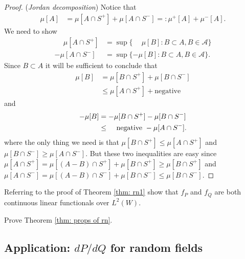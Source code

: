 \begin{shaded}
\begin{proof}
({\it Jordan decomposition}) Notice that
\begin{align*}
\mu[A]
& = \mu[A\cap S^+] + \mu[A\cap S^-] =:\mu^+[A] + \mu^-[A].
\end{align*}
We need to show
\begin{align*}
\phantom{-}\mu[A\cap S^+] & = \sup\{\phantom{-}\mu[B]\colon B\subset A, B\in \mathcal A  \} \\
-\mu[A\cap S^-] & = \sup\{-\mu[B]\colon B\subset A, B\in \mathcal A  \}.
\end{align*}
Since $B\subset A$ it will be sufficient to conclude that
\begin{align*}
\mu[B]
&= \mu[B\cap S^+] + \mu[B\cap S^-]\\
&\leq \mu[A\cap S^+] + \text{negative}
\end{align*}
and
\begin{align*}
-\mu[B] &= -\mu[B\cap S^+] - \mu[B\cap S^-]\\
&\leq \phantom{-}\text{\,\,negative\,\,} -  \mu[A\cap S^-].
\end{align*}
where the only thing we need is that $\mu[B\cap S^+]\leq \mu[A\cap S^+]$ and $\mu[B\cap S^-]\geq \mu[A\cap S^-]$. But these two inequalities are easy since $\mu[A\cap S^+] = \mu[(A-B)\cap S^+]+\mu[B\cap S^+]\geq \mu[B\cap S^+]$ and $\mu[A\cap S^-] = \mu[(A-B)\cap S^-]+\mu[B\cap S^-]\leq \mu[B\cap S^-]$.
\end{proof}



\end{shaded}





\begin{exercise}
\label{ex: for rn1 thm}
Referring to the proof of Theorem \ref{thm: rn1} show that $f_P$ and $f_Q$ are both continuous linear functionals over $L^2(W)$.
\end{exercise}


\begin{exercise}
\label{ex: for rn2 thm}
Prove Theorem \ref{thm: props of rn}.
\end{exercise}



\subsection{Application: $dP/dQ$ for random fields}




